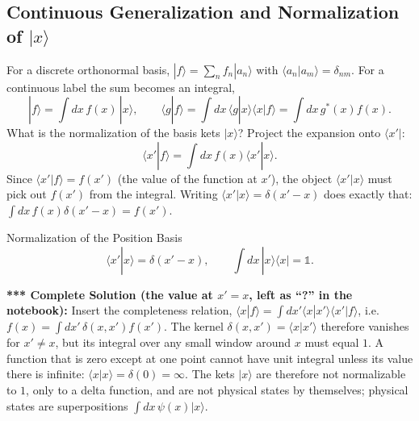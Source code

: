 \documentclass[11pt,a4paper]{article}
\begin{document}
\subsection{Continuous Generalization and Normalization of \texorpdfstring{$|x\rangle$}{the position kets}}
For a discrete orthonormal basis, $|f\rangle=\sum_nf_n|a_n\rangle$ with $\langle a_n|a_m\rangle=\delta_{nm}$. For a continuous label the sum becomes an integral,
\[
|f\rangle=\int dx\,f(x)\,|x\rangle,\qquad
\langle g|f\rangle=\int dx\,\langle g|x\rangle\langle x|f\rangle=\int dx\,g^*(x)f(x).
\]
What is the normalization of the basis kets $|x\rangle$? Project the expansion onto $\langle x'|$:
\[
\langle x'|f\rangle=\int dx\,f(x)\langle x'|x\rangle .
\]
Since $\langle x'|f\rangle=f(x')$ (the value of the function at $x'$), the object $\langle x'|x\rangle$ must pick out $f(x')$ from the integral. Writing $\langle x'|x\rangle=\delta(x'-x)$ does exactly that: $\int dx\,f(x)\delta(x'-x)=f(x')$.

\begin{thm}{Normalization of the Position Basis}
\[
\langle x'|x\rangle=\delta(x'-x),\qquad \int dx\,|x\rangle\langle x|=\mathbb 1 .
\]
\end{thm}

\textbf{*** Complete Solution (the value at $x'=x$, left as ``?'' in the notebook):} Insert the completeness relation, $\langle x|f\rangle=\int dx'\langle x|x'\rangle\langle x'|f\rangle$, i.e.\ $f(x)=\int dx'\,\delta(x,x')f(x')$. The kernel $\delta(x,x')=\langle x|x'\rangle$ therefore vanishes for $x'\neq x$, but its integral over any small window around $x$ must equal $1$. A function that is zero except at one point cannot have unit integral unless its value there is infinite: $\langle x|x\rangle=\delta(0)=\infty$. The kets $|x\rangle$ are therefore not normalizable to $1$, only to a delta function, and are not physical states by themselves; physical states are superpositions $\int dx\,\psi(x)|x\rangle$.
\end{document}
